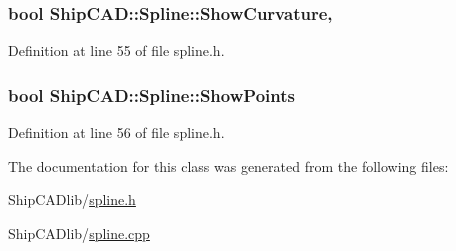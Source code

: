 \hypertarget{classShipCAD_1_1Spline_a9572e31014a04689a2987475c9bff080}{
\subsubsection[{Show\-Curvature}]{\setlength{\rightskip}{0pt plus 5cm}bool Ship\-C\-A\-D\-::\-Spline\-::\-Show\-Curvature\hspace{0.3cm}{\ttfamily [read]}, {\ttfamily [write]}}}\label{classShipCAD_1_1Spline_a9572e31014a04689a2987475c9bff080}


Definition at line 55 of file spline.\-h.

\hypertarget{classShipCAD_1_1Spline_abac1aad3fc0e33ea8ccda1a94bea8467}{
\subsubsection[{Show\-Points}]{\setlength{\rightskip}{0pt plus 5cm}bool Ship\-C\-A\-D\-::\-Spline\-::\-Show\-Points}}\label{classShipCAD_1_1Spline_abac1aad3fc0e33ea8ccda1a94bea8467}


Definition at line 56 of file spline.\-h.



The documentation for this class was generated from the following files\-:\begin{DoxyCompactItemize}
\item 
Ship\-C\-A\-Dlib/\hyperlink{spline_8h}{spline.\-h}\item 
Ship\-C\-A\-Dlib/\hyperlink{spline_8cpp}{spline.\-cpp}\end{DoxyCompactItemize}
